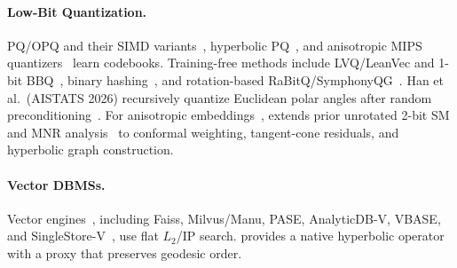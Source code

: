 \paragraph{Low-Bit Quantization.}
{PQ}/{OPQ} and their {SIMD} variants~\cite{jegou2011pq,ge2013opq,andre2015cache,andre2017accelerated}, hyperbolic {PQ}~\cite{qiu2024hihpq}, and anisotropic {MIPS} quantizers~\cite{guo2020accelerating,sun2023soar} learn codebooks.
Training-free methods include {LVQ}/{LeanVec} and 1-bit {BBQ}~\cite{aguerrebere2023similarity,tepper2024leanvec,trent2024bbq}, binary hashing~\cite{indyk1998approximate,charikar2002similarity}, and rotation-based {RaBitQ}/{SymphonyQG}~\cite{gao2024rabitq,gao2025extendedrabitq,gou2025symphonyqg}. Han et al.\ (AISTATS 2026) recursively quantize Euclidean polar angles after random preconditioning~\cite{han2026polarquant}.
For anisotropic embeddings~\cite{wang2020understanding,betser2026infonce}, \rquiver{} extends prior unrotated 2-bit {SM} and {MNR} analysis~\cite{xiao2026quiver,xiao2026decisions} to conformal weighting, tangent-cone residuals, and hyperbolic graph construction.

\paragraph{Vector DBMSs.}
Vector engines~\cite{pan2024survey}, including {Faiss}, {Milvus}/{Manu}, {PASE}, {AnalyticDB-V}, {VBASE}, and {SingleStore-V}~\cite{johnson2019billion,douze2024faiss,wang2021milvus,guo2022manu,yang2020pase,wei2020analyticdb,zhang2023vbase,chen2024singlestore}, use flat $L_2$/IP search. \rquiver{} provides a native hyperbolic operator with a proxy that preserves geodesic order.
